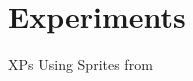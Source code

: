 \section{Experiments}\label{XPs}

\begin{frame}{XPs}
    Using Sprites from \cite{li_disentangled_2018}
\end{frame}